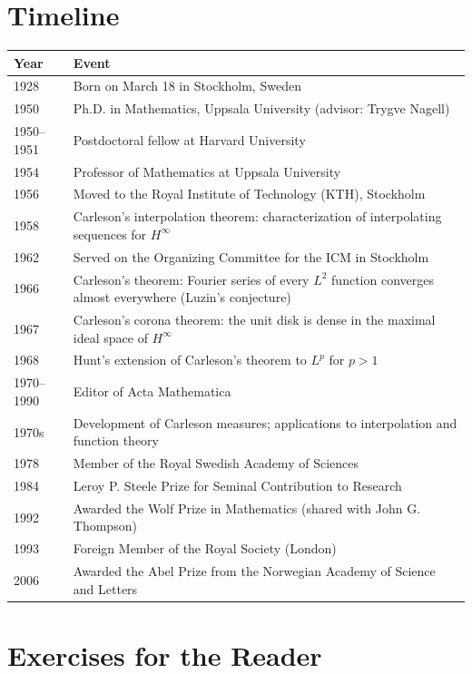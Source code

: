 \section*{Timeline}
\begin{tabularx}{\linewidth}{|p{1.5cm}|>{\raggedright\arraybackslash}X|}
\hline
\textbf{Year} & \textbf{Event} \\ \hline
1928 & Born on March 18 in Stockholm, Sweden \\ \hline
1950 & Ph.D. in Mathematics, Uppsala University (advisor: Trygve Nagell) \\ \hline
1950--1951 & Postdoctoral fellow at Harvard University \\ \hline
1954 & Professor of Mathematics at Uppsala University \\ \hline
1956 & Moved to the Royal Institute of Technology (KTH), Stockholm \\ \hline
1958 & Carleson's interpolation theorem: characterization of interpolating sequences for \(H^\infty\) \\ \hline
1962 & Served on the Organizing Committee for the ICM in Stockholm \\ \hline
1966 & Carleson's theorem: Fourier series of every \(L^2\) function converges almost everywhere (Luzin's conjecture) \\ \hline
1967 & Carleson's corona theorem: the unit disk is dense in the maximal ideal space of \(H^\infty\) \\ \hline
1968 & Hunt's extension of Carleson's theorem to \(L^p\) for \(p > 1\) \\ \hline
1970--1990 & Editor of Acta Mathematica \\ \hline
1970s & Development of Carleson measures; applications to interpolation and function theory \\ \hline
1978 & Member of the Royal Swedish Academy of Sciences \\ \hline
1984 & Leroy P. Steele Prize for Seminal Contribution to Research \\ \hline
1992 & Awarded the Wolf Prize in Mathematics (shared with John G. Thompson) \\ \hline
1993 & Foreign Member of the Royal Society (London) \\ \hline
2006 & Awarded the Abel Prize from the Norwegian Academy of Science and Letters \\ \hline
\end{tabularx}

\section*{Exercises for the Reader}

